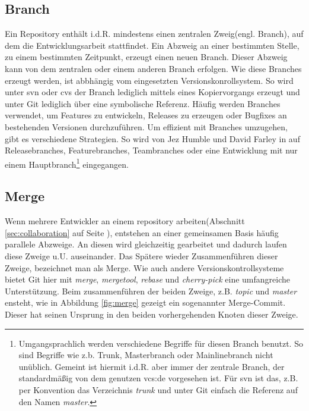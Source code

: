 \subsection{Branch}\label{sec:branch}
Ein Repository enthält i.d.R. mindestens einen zentralen Zweig(engl. Branch), auf dem
die Entwicklungsarbeit stattfindet. Ein Abzweig an einer bestimmten Stelle, zu
einem bestimmten Zeitpunkt, erzeugt einen neuen Branch. Dieser Abzweig kann von
dem zentralen oder einem anderen Branch erfolgen. Wie diese Branches erzeugt
werden, ist abbhängig vom eingesetzten Versionskonrollsystem. So wird unter
\acrshort{svn} oder \acrshort{cvs} der Branch lediglich mittels eines Kopiervorgangs
erzeugt und unter Git lediglich
über eine symbolische Referenz. Häufig werden Branches verwendet, um Features zu
entwickeln, Releases zu erzeugen oder Bugfixes an bestehenden Versionen
durchzuführen\cite[S.~21]{gitosp}. Um effizient mit Branches umzugehen, gibt es
verschiedene Strategien. So wird von Jez Humble und David Farley in
\cite[S.~408-412]{cd} auf Releasebranches, Featurebranches, Teambranches oder
eine Entwicklung mit nur einem Hauptbranch\footnote{Umgangsprachlich werden
verschiedene Begriffe für diesen Branch benutzt. So sind Begriffe wie z.b.
Trunk, Masterbranch oder Mainlinebranch nicht unüblich. Gemeint ist hiermit
i.d.R. aber immer der zentrale Branch, der standardmäßig von dem genutzen
\acrlong{vcs:de} vorgesehen ist. Für \acrshort{svn} ist das, z.B. per Konvention
das Verzeichnis \textit{trunk} und unter Git einfach die Referenz auf den Namen
\textit{master}.} eingegangen.

\subsection{Merge}\label{sec:merge}
Wenn mehrere Entwickler an einem \gls{repository} arbeiten(Abschnitt
\ref{sec:collaboration} auf Seite \pageref{sec:collaboration}), entstehen an
einer gemeinsamen Basis häufig parallele Abzweige. An diesen wird gleichzeitig
gearbeitet und dadurch laufen diese Zweige u.U. auseinander. Das Spätere wieder
Zusammenführen dieser Zweige, bezeichnet man als Merge. Wie auch andere
Versionskontrollsysteme bietet Git hier mit \textit{merge}, \textit{mergetool},
\textit{rebase} und \textit{cherry-pick} eine umfangreiche
Unterstützung\cite[S.~vii]{gitwf}. Beim zusammenführen der beiden Zweige, z.B.
\textit{topic} und \textit{master} ensteht, wie in Abbildung \ref{fig:merge}
gezeigt ein sogenannter Merge-Commit. Dieser hat seinen Ursprung in den beiden
vorhergehenden Knoten dieser Zweige.

